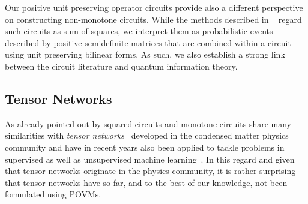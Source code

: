 Our positive unit preserving operator circuits provide also a different perspective on constructing non-monotone circuits. While the methods described in ~\citep{sladek2023encoding,loconte2024subtractive,loconte2024sum,wangrelationship} regard such circuits as sum of squares, we interpret them as probabilistic events described by positive semidefinite matrices that are combined within a circuit using unit preserving bilinear forms. As such, we also establish a strong link between the circuit literature and quantum information theory.


\subsection{Tensor Networks}

As already pointed out by \citet{loconte2024subtractive,loconte2024sum} squared circuits and monotone circuits share many similarities with \textit{tensor networks}~\citep{orus2014practical,white1992density}
developed in the condensed matter physics community and have in recent years also been applied to tackle problems in supervised as well as unsupervised machine learning~\citep{cheng2019tree,han2018unsupervised,stoudenmire2016supervised}. In this regard and given that tensor networks originate in the physics community, it is rather surprising that tensor networks have so far, and to the best of our knowledge, not been formulated using POVMs.

